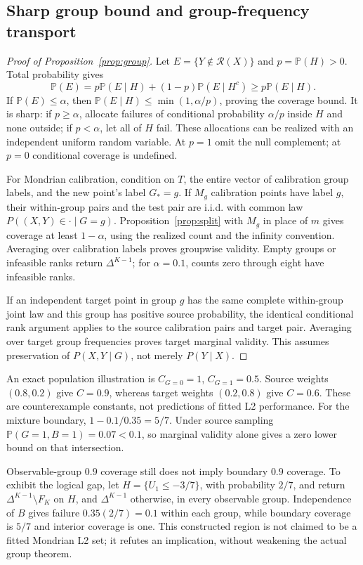 \documentclass{article}
\theoremstyle{plain}
\newcommand{\simp}{\Delta^{K-1}}
\newcommand{\Prob}{\mathbb{P}}
\newcommand{\R}{\mathcal{R}}
\begin{document}
\subsection{Sharp group bound and group-frequency transport}
\begin{proof}[Proof of Proposition~\ref{prop:group}]
Let $E=\{Y\notin\R(X)\}$ and $p=\Prob(H)>0$. Total probability gives
\begin{equation}
 \Prob(E)=p\Prob(E\mid H)+(1-p)\Prob(E\mid H^c)\geq p\Prob(E\mid H).
\end{equation}
If $\Prob(E)\leq\alpha$, then $\Prob(E\mid H)\leq\min(1,\alpha/p)$, proving the coverage bound. It is sharp: if $p\geq\alpha$, allocate failures of conditional probability $\alpha/p$ inside $H$ and none outside; if $p<\alpha$, let all of $H$ fail. These allocations can be realized with an independent uniform random variable. At $p=1$ omit the null complement; at $p=0$ conditional coverage is undefined.

For Mondrian calibration, condition on $T$, the entire vector of calibration group labels, and the new point's label $G_*=g$. If $M_g$ calibration points have label $g$, their within-group pairs and the test pair are i.i.d. with common law $P((X,Y)\in\cdot\mid G=g)$. Proposition~\ref{prop:split} with $M_g$ in place of $m$ gives coverage at least $1-\alpha$, using the realized count and the infinity convention. Averaging over calibration labels proves groupwise validity. Empty groups or infeasible ranks return $\simp$; for $\alpha=0.1$, counts zero through eight have infeasible ranks.

If an independent target point in group $g$ has the same complete within-group joint law and this group has positive source probability, the identical conditional rank argument applies to the source calibration pairs and target pair. Averaging over target group frequencies proves target marginal validity. This assumes preservation of $P(X,Y\mid G)$, not merely $P(Y\mid X)$.
\end{proof}

An exact population illustration is $C_{G=0}=1$, $C_{G=1}=0.5$. Source weights $(0.8,0.2)$ give $C=0.9$, whereas target weights $(0.2,0.8)$ give $C=0.6$. These are counterexample constants, not predictions of fitted L2 performance. For the mixture boundary, $1-0.1/0.35=5/7$. Under source sampling $\Prob(G=1,B=1)=0.07<0.1$, so marginal validity alone gives a zero lower bound on that intersection.

Observable-group $0.9$ coverage still does not imply boundary $0.9$ coverage. To exhibit the logical gap, let $H=\{U_1\leq-3/7\}$, with probability $2/7$, and return $\simp\setminus F_K$ on $H$, and $\simp$ otherwise, in every observable group. Independence of $B$ gives failure $0.35(2/7)=0.1$ within each group, while boundary coverage is $5/7$ and interior coverage is one. This constructed region is not claimed to be a fitted Mondrian L2 set; it refutes an implication, without weakening the actual group theorem.
\end{document}
